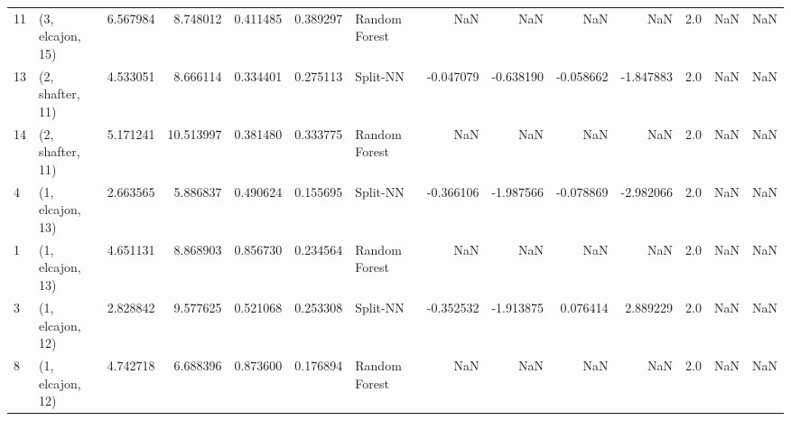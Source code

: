\begin{tabular}{llrrrrlrrrrrrl}
11 &  (3, elcajon, 15) &   6.567984 &   8.748012 &   0.411485 &  0.389297 &  Random Forest &             NaN &           NaN &            NaN &          NaN &            2.0 &    NaN &              NaN \\
13 &  (2, shafter, 11) &   4.533051 &   8.666114 &   0.334401 &  0.275113 &       Split-NN &       -0.047079 &     -0.638190 &      -0.058662 &    -1.847883 &            2.0 &    NaN &              NaN \\
14 &  (2, shafter, 11) &   5.171241 &  10.513997 &   0.381480 &  0.333775 &  Random Forest &             NaN &           NaN &            NaN &          NaN &            2.0 &    NaN &              NaN \\
4  &  (1, elcajon, 13) &   2.663565 &   5.886837 &   0.490624 &  0.155695 &       Split-NN &       -0.366106 &     -1.987566 &      -0.078869 &    -2.982066 &            2.0 &    NaN &              NaN \\
1  &  (1, elcajon, 13) &   4.651131 &   8.868903 &   0.856730 &  0.234564 &  Random Forest &             NaN &           NaN &            NaN &          NaN &            2.0 &    NaN &              NaN \\
3  &  (1, elcajon, 12) &   2.828842 &   9.577625 &   0.521068 &  0.253308 &       Split-NN &       -0.352532 &     -1.913875 &       0.076414 &     2.889229 &            2.0 &    NaN &              NaN \\
8  &  (1, elcajon, 12) &   4.742718 &   6.688396 &   0.873600 &  0.176894 &  Random Forest &             NaN &           NaN &            NaN &          NaN &            2.0 &    NaN &              NaN \\
\bottomrule
\end{tabular}
